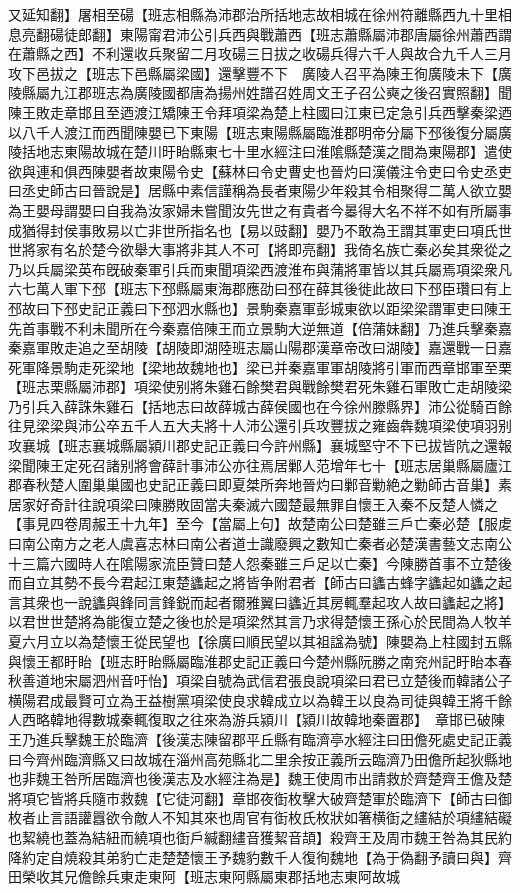 又延知翻】屠相至碭【班志相縣為沛郡治所括地志故相城在徐州符離縣西九十里相息亮翻碭徒郎翻】東陽甯君沛公引兵西與戰蕭西【班志蕭縣屬沛郡唐屬徐州蕭西謂在蕭縣之西】不利還收兵聚留二月攻碭三日拔之收碭兵得六千人與故合九千人三月攻下邑拔之【班志下邑縣屬梁國】還擊豐不下　廣陵人召平為陳王徇廣陵未下【廣陵縣屬九江郡班志為廣陵國都唐為揚州姓譜召姓周文王子召公奭之後召實照翻】聞陳王敗走章邯且至迺渡江矯陳王令拜項梁為楚上柱國曰江東已定急引兵西擊秦梁迺以八千人渡江而西聞陳嬰已下東陽【班志東陽縣屬臨淮郡明帝分屬下邳後復分屬廣陵括地志東陽故城在楚川旴眙縣東七十里水經注曰淮隂縣楚漢之間為東陽郡】遣使欲與連和俱西陳嬰者故東陽令史【蘇林曰令史曹史也晉灼曰漢儀注令吏曰令史丞吏曰丞史師古曰晉說是】居縣中素信謹稱為長者東陽少年殺其令相聚得二萬人欲立嬰為王嬰母謂嬰曰自我為汝家婦未嘗聞汝先世之有貴者今㬥得大名不祥不如有所屬事成猶得封侯事敗易以亡非世所指名也【易以豉翻】嬰乃不敢為王謂其軍吏曰項氏世世將家有名於楚今欲舉大事將非其人不可【將即亮翻】我倚名族亡秦必矣其衆從之乃以兵屬梁英布旣破秦軍引兵而東聞項梁西渡淮布與蒲將軍皆以其兵屬焉項梁衆凡六七萬人軍下邳【班志下邳縣屬東海郡應劭曰邳在薛其後徙此故曰下邳臣瓚曰有上邳故曰下邳史記正義曰下邳泗水縣也】景駒秦嘉軍彭城東欲以距梁梁謂軍吏曰陳王先首事戰不利未聞所在今秦嘉倍陳王而立景駒大逆無道【倍蒲妹翻】乃進兵擊秦嘉秦嘉軍敗走追之至胡陵【胡陵即湖陸班志屬山陽郡漢章帝改曰湖陵】嘉還戰一日嘉死軍降景駒走死梁地【梁地故魏地也】梁已并秦嘉軍軍胡陵將引軍而西章邯軍至栗【班志栗縣屬沛郡】項梁使别將朱雞石餘樊君與戰餘樊君死朱雞石軍敗亡走胡陵梁乃引兵入薛誅朱雞石【括地志曰故薛城古薛侯國也在今徐州滕縣界】沛公從騎百餘往見梁梁與沛公卒五千人五大夫將十人沛公還引兵攻豐拔之雍齒犇魏項梁使項羽别攻襄城【班志襄城縣屬潁川郡史記正義曰今許州縣】襄城堅守不下已拔皆阬之還報梁聞陳王定死召諸别將會薛計事沛公亦往焉居鄛人范增年七十【班志居巢縣屬廬江郡春秋楚人圍巢巢國也史記正義曰即夏桀所奔地晉灼曰鄛音勦絶之勦師古音巢】素居家好奇計往說項梁曰陳勝敗固當夫秦滅六國楚最無罪自懷王入秦不反楚人憐之【事見四卷周赧王十九年】至今【當屬上句】故楚南公曰楚雖三戶亡秦必楚【服䖍曰南公南方之老人虞喜志林曰南公者道士識廢興之數知亡秦者必楚漢書藝文志南公十三篇六國時人在隂陽家流臣贊曰楚人怨秦雖三戶足以亡秦】今陳勝首事不立楚後而自立其勢不長今君起江東楚蠭起之將皆争附君者【師古曰蠭古蜂字蠭起如蠭之起言其衆也一說蠭與鋒同言鋒鋭而起者爾雅翼曰蠭近其房輒羣起攻人故曰蠭起之將】以君世世楚將為能復立楚之後也於是項梁然其言乃求得楚懷王孫心於民間為人牧羊夏六月立以為楚懷王從民望也【徐廣曰順民望以其祖諡為號】陳嬰為上柱國封五縣與懷王都盱眙【班志盱眙縣屬臨淮郡史記正義曰今楚州縣阮勝之南兖州記盱眙本春秋善道地宋屬泗州音吁怡】項梁自號為武信君張良說項梁曰君已立楚後而韓諸公子横陽君成最賢可立為王益樹黨項梁使良求韓成立以為韓王以良為司徒與韓王將千餘人西略韓地得數城秦輒復取之往來為游兵潁川【潁川故韓地秦置郡】　章邯已破陳王乃進兵擊魏王於臨濟【後漢志陳留郡平丘縣有臨濟亭水經注曰田儋死處史記正義曰今齊州臨濟縣又曰故城在淄州高苑縣北二里余按正義所云臨濟乃田儋所起狄縣地也非魏王咎所居臨濟也後漢志及水經注為是】魏王使周市出請救於齊楚齊王儋及楚將項它皆將兵隨市救魏【它徒河翻】章邯夜衘枚擊大破齊楚軍於臨濟下【師古曰御枚者止言語讙囂欲令敵人不知其來也周官有衘枚氏枚狀如箸横衘之繣結於項繣結礙也絜繞也蓋為結紐而繞項也衘戶緘翻繣音獲絜音頡】殺齊王及周市魏王咎為其民約降約定自燒殺其弟豹亡走楚楚懷王予魏豹數千人復徇魏地【為于偽翻予讀曰與】齊田榮收其兄儋餘兵東走東阿【班志東阿縣屬東郡括地志東阿故城